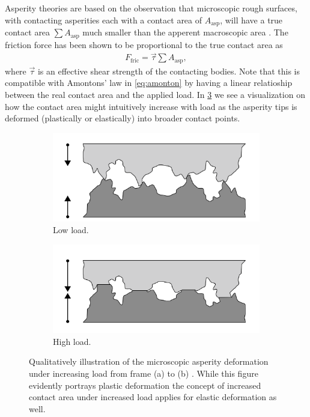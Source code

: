Asperity theories are based on the observation that microscopic rough surfaces,
with contacting asperities each with a contact area of $A_{\text{asp}}$, will
have a true contact area $\sum A_{\text{asp}}$ much smaller than the apperent
macroscopic area \cite{kim_nano-scale_2009}. The friction
force has been shown to be proportional to the true contact area as 
\begin{align*}
  F_\text{fric} = \vec{\tau} \sum A_{\text{asp}},
\end{align*}
where $\vec{\tau}$ is an effective shear strength of the contacting bodies. Note
that this is compatible with Amontons’ law in \cref{eq:amonton} by having a linear relatioship between the real contact area and the
applied load. In \cref{fig:asperity_contact} we see a
visualization on how the contact area might intuitively increase with load as the asperity tips is deformed (plastically or elastically) into broader contact points.
\begin{figure}[H]
  \centering
  \begin{subfigure}[b]{0.49\textwidth}
      \centering
      \includegraphics[width=\textwidth]{figures/theory/asperities_top.png}
      \caption{Low load.}
      \label{fig:asp_left}
  \end{subfigure}
  \hfill
  \begin{subfigure}[b]{0.49\textwidth}
      \centering
      \includegraphics[width=\textwidth]{figures/theory/asperities_bottom.png}
      \caption{High load.}
      \label{fig:asp_right}
  \end{subfigure}
  \hfill
     \caption{Qualitatively illustration of the microscopic asperity deformation
     under increasing load from frame (a) to (b) \cite{wiki:asperities}. While this figure evidently portrays plastic deformation the concept of increased contact area under increased load applies for elastic deformation as well.}
     \label{fig:asperity_contact}
\end{figure}

